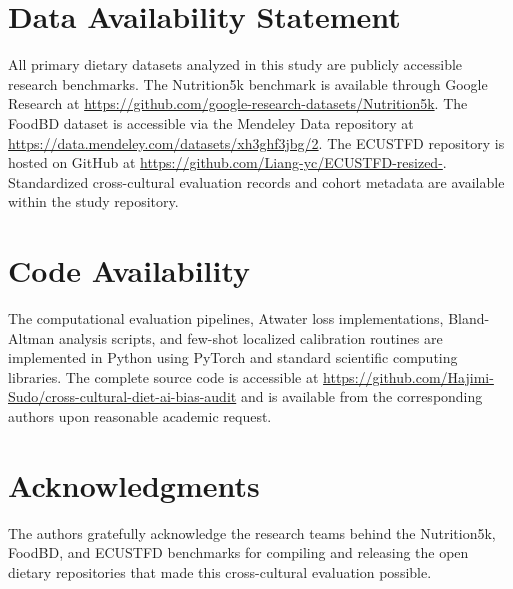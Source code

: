 \documentclass[utf8]{FrontiersinVancouver}
\begin{document}
\section*{Data Availability Statement}
All primary dietary datasets analyzed in this study are publicly accessible research benchmarks. The Nutrition5k benchmark is available through Google Research at \url{https://github.com/google-research-datasets/Nutrition5k}. The FoodBD dataset is accessible via the Mendeley Data repository at \url{https://data.mendeley.com/datasets/xh3ghf3jbg/2}. The ECUSTFD repository is hosted on GitHub at \url{https://github.com/Liang-yc/ECUSTFD-resized-}. Standardized cross-cultural evaluation records and cohort metadata are available within the study repository.

\section*{Code Availability}
The computational evaluation pipelines, Atwater loss implementations, Bland-Altman analysis scripts, and few-shot localized calibration routines are implemented in Python using PyTorch and standard scientific computing libraries. The complete source code is accessible at \url{https://github.com/Hajimi-Sudo/cross-cultural-diet-ai-bias-audit} and is available from the corresponding authors upon reasonable academic request.

\section*{Acknowledgments}
The authors gratefully acknowledge the research teams behind the Nutrition5k, FoodBD, and ECUSTFD benchmarks for compiling and releasing the open dietary repositories that made this cross-cultural evaluation possible.



\end{document}
